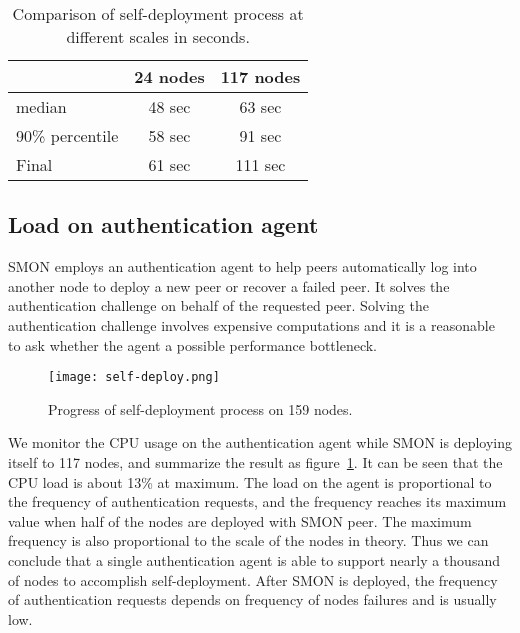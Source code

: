 \begin{table}
\centering
\begin{tabular}{|l|c|c|}
\hline
  & 24 nodes & 117 nodes\\
\hline
median & 48 sec & 63 sec \\
\hline
90\% percentile & 58 sec & 91 sec\\
\hline
Final & 61 sec & 111 sec\\
\hline
\end{tabular}
\caption{Comparison of self-deployment process at different
scales in seconds.}
\label{tbl:scalability}
\end{table}

\subsection{Load on authentication agent}

SMON employs an authentication agent to help peers
automatically log into another node to deploy a new peer or
recover a failed peer. It solves the authentication
challenge on behalf of the requested peer. Solving the
authentication challenge involves expensive computations and
it is a reasonable to ask whether the agent a possible
performance bottleneck.

\begin{figure}%
\centering
\texttt{[image: self-deploy.png]}
\caption{Progress of self-deployment process on 159
nodes.}
\label{fig:agentload}
\end{figure}

We monitor the CPU usage on the authentication agent while
SMON is deploying itself to 117 nodes, and summarize the
result as figure~\ref{fig:agentload}. It can be seen that
the CPU load is about 13\% at maximum. The load on the agent
is proportional to the frequency of authentication requests,
and the frequency reaches its maximum value when half of the
nodes are deployed with SMON peer. The maximum frequency is
also proportional to the scale of the nodes in theory. Thus
we can conclude that a single authentication agent is able
to support nearly a thousand of nodes to accomplish
self-deployment. After SMON is deployed, the frequency of
authentication requests depends on frequency of nodes
failures and is usually low.

